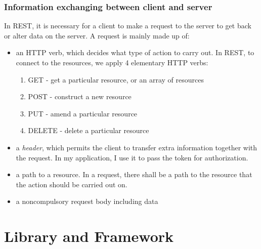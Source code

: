 \documentclass[a4paper, 11pt,openany]{book} %
\begin{document}
\subsubsection{Information exchanging between client and server}
In REST, it is necessary for a client to make a request to the server to get back or alter data on the server. A request is mainly made up of:
\begin{itemize}
    \item an HTTP verb, which decides what type of action to carry out. In REST, to connect to the resources, we apply 4  elementary HTTP verbs:
    \begin{enumerate}
        \item GET - get a particular resource, or an array of resources
        \item POST - construct a new resource
        \item PUT - amend a particular resource
        \item DELETE - delete a particular resource
    \end{enumerate}
    \item a \textit{header}, which permits the client to transfer extra information together with the request. In my application, I use it to pass the token for authorization.
    \item a path to a resource. In a request, there shall be a path to the resource that the action should be carried out on.
    \item a noncompulsory request body including data\cite{rest}
\end{itemize}

\section{Library and Framework}
\end{document}
